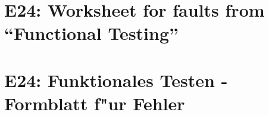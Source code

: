 
\thispagestyle{empty}
\ifenglish
\section*{E24: Worksheet for faults from ``Functional Testing''}

\fi
\ifgerman
\section*{E24: Funktionales Testen - Formblatt f"ur Fehler}

\fi

